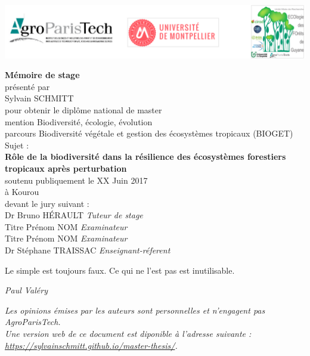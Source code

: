\documentclass[12pt,]{article}
\theoremstyle{definition}
\theoremstyle{definition}
\theoremstyle{remark}
\begin{document}
  \includegraphics{images/logos}
  
  \begin{center}
    \LARGE{\textbf{Mémoire de stage}} \\
    \vspace*{\fill}
    \large{présenté par} \\
    \large{Sylvain SCHMITT} \\
    \vspace*{\fill}
    \large{pour obtenir le diplôme national de master} \\
    \large{mention Biodiversité, écologie, évolution} \\
    \small{parcours Biodiversité végétale et gestion des écosystèmes tropicaux (BIOGET)} \\
    \vspace*{\fill}
    \large{Sujet :} \\
    \Large{\textbf{Rôle de la biodiversité dans la résilience des écosystèmes forestiers tropicaux après perturbation}} \\
    \vspace*{\fill}
    \large{soutenu publiquement le XX Juin 2017} \\
    \large{à Kourou} \\
    \vspace*{\fill}
    \large{devant le jury suivant :} \\
    \vspace*{\fill}
    Dr Bruno HÉRAULT  \emph{Tuteur de stage} \\
    Titre Prénom NOM  \emph{Examinateur} \\
    Titre Prénom NOM  \emph{Examinateur} \\
    Dr Stéphane TRAISSAC  \emph{Enseignant-réferent} \\
  \end{center}
  
  \newpage
  \vspace*{\fill}
  \epigraph{Le simple est toujours faux. Ce qui ne l'est pas est inutilisable.}{\textit{Paul Valéry}}
  \vspace*{\fill}
  \emph{Les opinions émises par les auteurs sont personnelles et n'engagent pas AgroParisTech.}\\
  \emph{Une version web de ce document est diponible à l'adresse suivante : \url{https://sylvainschmitt.github.io/master-thesis/}.}
  \newpage
\end{document}
